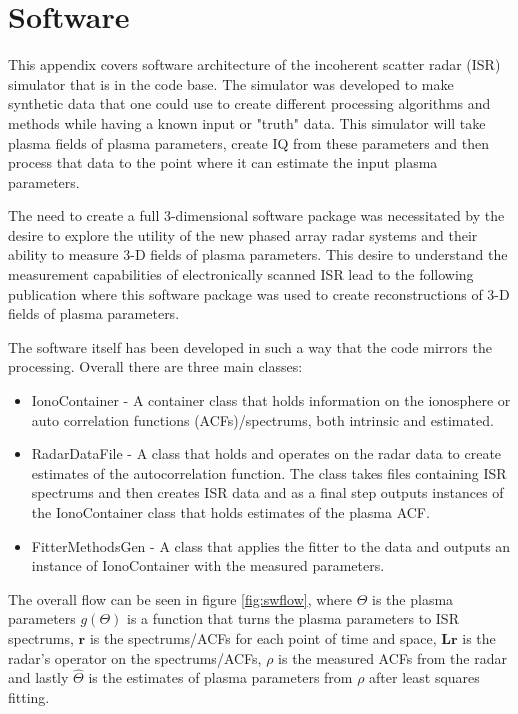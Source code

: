 \chapter{Software}
\label{chapter:appsoft}
\thispagestyle{myheadings}

\graphicspath{{Appendix/Figures/}}


This appendix covers software architecture of the incoherent scatter radar (ISR) simulator that is in the code base. The simulator was developed to make synthetic data that one could use to create different processing algorithms and methods while having a known input or "truth" data. This simulator will take plasma fields of plasma parameters, create IQ from these parameters and then process that data to the point where it can estimate the input plasma parameters.

The need to create a full 3-dimensional software package was necessitated by the desire to explore the utility of the new phased array radar systems and their ability to measure 3-D fields of plasma parameters. This desire to understand the measurement capabilities of electronically scanned ISR lead to the following publication \cite{RDS:RDS20236} where this software package was used to create reconstructions of 3-D fields of plasma parameters.

The software itself has been developed in such a way that the code mirrors the processing. Overall there are three main classes: 

\begin{itemize} 
\item IonoContainer - A container class that holds information on the ionosphere or auto correlation functions (ACFs)/spectrums, both intrinsic and estimated.

\item RadarDataFile - A class that holds and operates on the radar data to create estimates of the autocorrelation function. The class takes files containing ISR spectrums and then creates ISR data and as a final step outputs instances of the IonoContainer class that holds estimates of the plasma ACF.

\item FitterMethodsGen - A class that applies the fitter to the data and outputs an instance of IonoContainer with the measured parameters. 
\end{itemize}

The overall flow can be seen in figure \ref{fig:swflow}, where  $\Theta$ is the plasma parameters $ g(\Theta)$ is a function that turns the plasma parameters to ISR spectrums, $ \mathbf{r}$ is the spectrums/ACFs for each point of time and space, $ \mathbf{Lr}$ is the radar's operator on the spectrums/ACFs, $ \rho$ is the measured ACFs from the radar and lastly $ \hat{\Theta}$ is the estimates of plasma parameters from $ \rho$ after least squares fitting.

